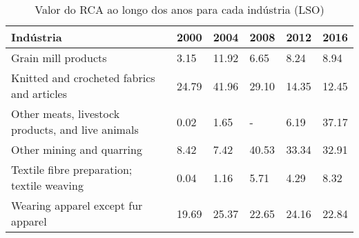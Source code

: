 \begin{table}
\centering
\caption{Valor do RCA ao longo dos anos para cada indústria (LSO)}
\begin{tabular}{p{6cm}p{1.5cm}p{1.5cm}p{1.5cm}p{1.5cm}p{1.5cm}}
\toprule
                                        Indústria &  2000 &  2004 &  2008 &  2012 &  2016 \\
\midrule
                              Grain mill products &  3.15 & 11.92 &  6.65 &  8.24 &  8.94 \\
       Knitted and crocheted fabrics and articles & 24.79 & 41.96 & 29.10 & 14.35 & 12.45 \\
Other meats, livestock products, and live animals &  0.02 &  1.65 &     - &  6.19 & 37.17 \\
                        Other mining and quarring &  8.42 &  7.42 & 40.53 & 33.34 & 32.91 \\
       Textile fibre preparation; textile weaving &  0.04 &  1.16 &  5.71 &  4.29 &  8.32 \\
               Wearing apparel except fur apparel & 19.69 & 25.37 & 22.65 & 24.16 & 22.84 \\
\bottomrule
\end{tabular}
\end{table}
